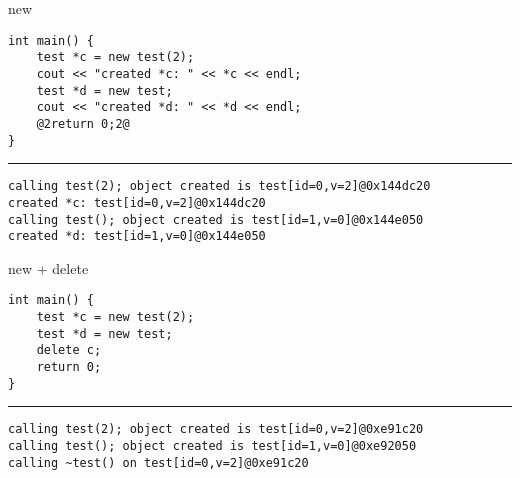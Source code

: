 \begin{frame}[fragile,label=testnew]{new}
\begin{lstlisting}
int main() {
    test *c = new test(2);
    cout << "created *c: " << *c << endl;
    test *d = new test;
    cout << "created *d: " << *d << endl;
    @2return 0;2@
}
\end{lstlisting}
\hrule
{}
\begin{lstlisting}
calling test(2); object created is test[id=0,v=2]@0x144dc20
created *c: test[id=0,v=2]@0x144dc20
calling test(); object created is test[id=1,v=0]@0x144e050
created *d: test[id=1,v=0]@0x144e050
\end{lstlisting}
\end{frame}

\begin{frame}[fragile,label=testnew]{new + delete}
\begin{lstlisting}
int main() {
    test *c = new test(2);
    test *d = new test;
    delete c;
    return 0;
}
\end{lstlisting}
\hrule
{}
\begin{lstlisting}
calling test(2); object created is test[id=0,v=2]@0xe91c20
calling test(); object created is test[id=1,v=0]@0xe92050
calling ~test() on test[id=0,v=2]@0xe91c20
\end{lstlisting}
\end{frame}



